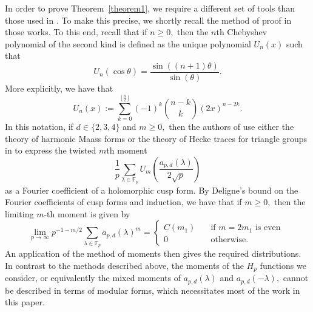 \documentclass[12pt]{amsart}
\theoremstyle{definition}
\theoremstyle{remark}
\numberwithin{equation}{section}
\def\F{{\mathbb F}}
\def\F{\mathbb{F}}
\begin{document}
In order to prove Theorem~\ref{theorem1}, we require a different set of tools than those used in \cite{HGFDistributionOnoSaikia, 3F2Explicit, ono2024distributionhessianvaluesgaussian, grove2024hypergeometricmomentshecketrace}. To make this precise, we shortly recall the method of proof in those works. To this end, recall that if $n\geq 0,$ then the $n$th Chebyshev polynomial of the second kind is defined as the unique polynomial $U_n(x)$ such that
\begin{equation}\label{ChebyshevPolynomialDefinition}
U_n(\cos\theta) = \frac{\sin((n+1)\theta)}{\sin(\theta)}.
\end{equation}
More explicitly, we have that
\begin{equation}\label{ChebyshevExplicit}
U_n(x):=\sum\limits_{k=0}^{\lfloor\frac{n}{2}\rfloor}(-1)^k\binom{n-k}{k}(2x)^{n-2k}.
\end{equation}
In this notation, if $d\in\{2,3,4\}$ and $m\geq 0,$ then the authors of \cite{HGFDistributionOnoSaikia,3F2Explicit,ono2024distributionhessianvaluesgaussian,grove2024hypergeometricmomentshecketrace} use either the theory of harmonic Maass forms or the theory of Hecke traces for triangle groups in \cite{HLLT} to express the twisted $m$th moment
$$
\frac{1}{p}\sum\limits_{\lambda\in\F_p}U_m\left(\frac{a_{p,d}(\lambda)}{2\sqrt{p}}\right)
$$
as a Fourier coefficient of a holomorphic cusp form. By Deligne's bound on the Fourier coefficients of cusp forms and induction, we have that if $m\geq 0,$ then the limiting $m$-th moment is given by
$$
\lim\limits_{p\to\infty}p^{-1-m/2}\sum\limits_{\lambda\in\F_p}a_{p,d}(\lambda)^m =\begin{cases}
    C(m_1) &\ \ \ \text{ if }m=2m_1\text{ is even } \\
    0 &\ \ \ \text{ otherwise}.
\end{cases}
$$
An application of the method of moments then gives the required distributions. In contrast to the methods described above, the moments of the $H_p$ functions we consider, or equivalently the mixed moments of $a_{p,d}(\lambda)$ and $a_{p,d}(-\lambda),$ cannot be described in terms of modular forms, which necessitates most of the work in this paper.
\end{document}
